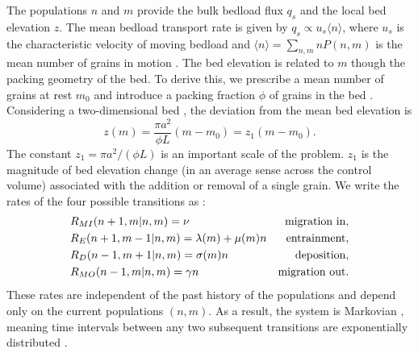 \documentclass[draft]{agujournal2018}
\begin{document}
The populations $n$ and $m$ provide the bulk bedload flux $q_s$ and the local bed elevation $z$.
The mean bedload transport rate is given by $q_s \propto u_s \langle n \rangle$, where $u_s$ is the characteristic velocity of moving bedload and $\langle n \rangle = 
\sum_{n,m}nP(n,m) $ is the mean number of grains in motion \citep[e.g.,][]{Charru2004, Ancey2008, Furbish2012a}.
The bed elevation is related to $m$ though the packing geometry of the bed.
To derive this, we prescribe a mean number of grains at rest $m_0$ and introduce a packing fraction $\phi$ of grains in the bed \citep{Torquato2018}.
Considering a two-dimensional bed \citep[e.g.,][]{Einstein1950, Paintal1971}, the deviation from the mean bed elevation is
\begin{equation} z(m) = \frac{\pi a^2}{\phi L}(m-m_0) = z_1(m-m_0). \label{eq:ele}
\end{equation}
The constant $z_1 = \pi a^2/(\phi L)$ is an important scale of the problem. 
$z_1$ is the magnitude of bed elevation change (in an average sense across the control volume) associated with the addition or removal of a single grain.
We write the rates of the four possible transitions as \citep[e.g.,][]{Ancey2008}:
\begin{align}
 &R_{MI}(n+1,m|n,m) = \nu & \text{migration in}, \label{eq:rate1}\\
 &R_E(n+1,m-1|n,m) =\lambda(m) + \mu(m) n  & \text{entrainment},  \label{eq:rate2}\\
 &R_D(n-1,m+1|n,m) =\sigma(m) n & \text{deposition},\label{eq:rate3}\\
 &R_{MO}(n-1,m|n,m) =\gamma n & \text{migration out\label{eq:rate4}}.
\end{align}
These rates are independent of the past history of the populations and depend only on the current populations $(n,m)$. 
As a result, the system is Markovian \citep[e.g.,][]{Cox1965, VanKampen1992}, meaning time intervals between any two subsequent transitions are exponentially distributed \citep[e.g.,][]{Gillespie2007}.
\end{document}
